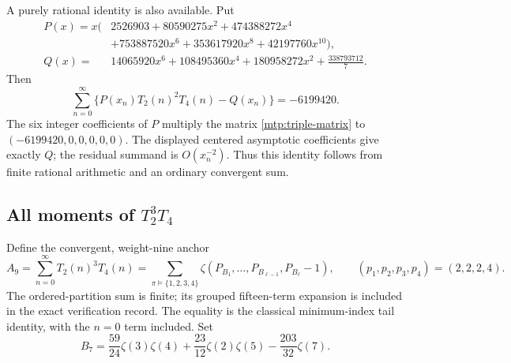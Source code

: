 A purely rational identity is also available. Put
\begin{align*}
 P(x)=x\bigl(&2526903+80590275x^2+474388272x^4\\
             &+753887520x^6+353617920x^8+42197760x^{10}\bigr),\\
 Q(x)={}&14065920x^6+108495360x^4+180958272x^2+\frac{338793712}{7}.
\end{align*}
Then
\begin{equation}\label{mtp:rational-sum}
 \sum_{n=0}^{\infty}\bigl\{P(x_n)T_2(n)^2T_4(n)-Q(x_n)\bigr\}
                                      =-6199420.
\end{equation}
The six integer coefficients of $P$ multiply the matrix
\eqref{mtp:triple-matrix} to $(-6199420,0,0,0,0,0)$.
The displayed centered asymptotic coefficients give exactly $Q$;
the residual summand is $O(x_n^{-2})$. Thus this identity follows from
finite rational arithmetic and an ordinary convergent sum.

\subsection{All moments of \texorpdfstring{$T_2^3T_4$}{T2 cubed times T4}}

Define the convergent, weight-nine anchor
\begin{equation}\label{mtp:A9}
 A_9=\sum_{n=0}^{\infty}T_2(n)^3T_4(n)
   =\sum_{\pi\models\{1,2,3,4\}}
        \zeta(P_{B_1},\ldots,P_{B_{\ell-1}},P_{B_\ell}-1),
 \qquad(p_1,p_2,p_3,p_4)=(2,2,2,4).
\end{equation}
The ordered-partition sum is finite; its grouped fifteen-term expansion
is included in the exact verification record. The equality is the
classical minimum-index tail identity, with the $n=0$ term included.
Set
\begin{equation}\label{mtp:B7}
 B_7=\frac{59}{24}\zeta(3)\zeta(4)
              +\frac{23}{12}\zeta(2)\zeta(5)-\frac{203}{32}\zeta(7).
\end{equation}

